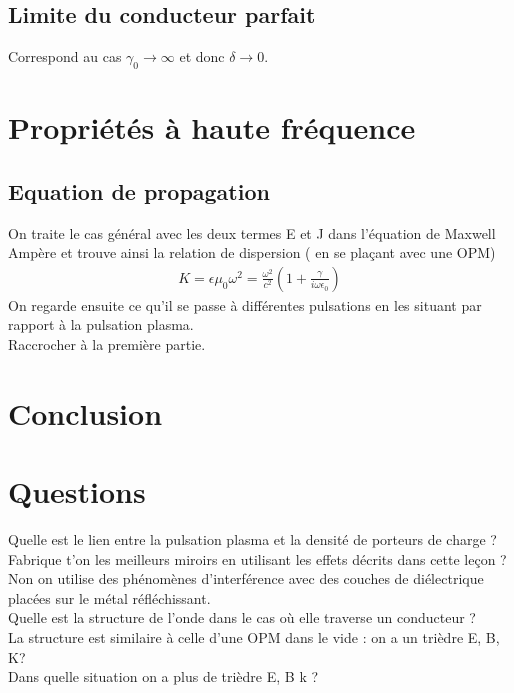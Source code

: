 \documentclass[12pt,prb,aps,epsf]{article}
\begin{document}
\subsection{Limite du conducteur parfait}
Correspond au cas $\gamma_0 \rightarrow \infty$ et donc $\delta \rightarrow 0$.

\section{Propriétés à haute fréquence}
\subsection{Equation de propagation}

On traite le cas général avec les deux termes E et J dans l'équation de Maxwell Ampère et trouve ainsi la relation de dispersion ( en se plaçant avec une OPM) 
\begin{eqnarray}
K = \epsilon \mu_0 \omega ^2 = \frac{\omega^2 }{c^2}(1 + \frac{\gamma}{i\omega \epsilon_0})
\end{eqnarray}
On regarde ensuite ce qu'il se passe à différentes pulsations en les situant par rapport à la pulsation plasma.\\
Raccrocher à la première partie.

\section{Conclusion}

\section*{Questions}
Quelle est le lien entre la pulsation plasma et la densité de porteurs de charge ?\\

Fabrique t'on les meilleurs miroirs en utilisant les effets décrits dans cette leçon ?\\
Non on utilise des phénomènes d'interférence avec des couches de diélectrique placées sur le métal réfléchissant.\\

Quelle est la structure de l'onde dans le cas où elle traverse un conducteur ?\\
La structure est similaire à celle d'une OPM dans le vide : on a un trièdre E, B, K?\\

Dans quelle situation on a plus de trièdre E, B k ?\\
\end{document}
